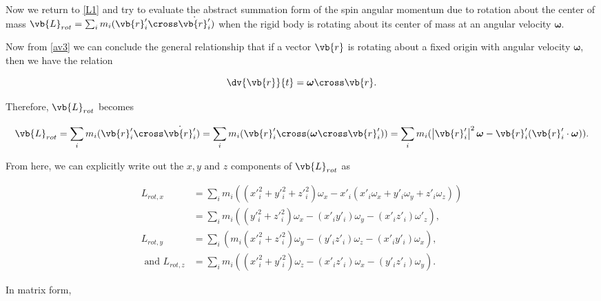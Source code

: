 \documentclass[a4paper,12pt]{report}
\begin{document}
Now we return to \cref{L1} and try to evaluate the abstract summation form of the spin angular momentum due to rotation about the center of mass \(\vb{L} _{rot} = \sum_{i}^{} m_{i} (\vb{r} '_{i} \cross \dot{\vb{r} '_{i} } )  \) when the rigid body is rotating about its center of mass at an angular velocity \(\boldsymbol{\omega } \).

Now from \cref{av3} we can conclude the general relationship that if a vector \(\vb{r} \)  is rotating about a fixed origin with angular velocity \(\boldsymbol{\omega } \), then we have the relation 

\begin{equation}
	\dv{\vb{r} }{t} =  \boldsymbol{\omega } \cross \vb{r} . \label{rotchange}  
\end{equation}

Therefore, \(\vb{L} _{rot} \)  becomes

\begin{equation}
	\vb{L} _{rot} = \sum_{i}^{} m_{i} (\vb{r} '_{i} \cross \dot{\vb{r} '_{i} } ) = \sum_{i}^{} m_{i} (\vb{r} '_{i} \cross (\boldsymbol{\omega } \cross \vb{r} '_{i}) ) = \sum_{i}^{} m_{i} (\left| \vb{r} '_{i}  \right| ^2 \boldsymbol{\omega } - \vb{r} '_{i} (\vb{r} '_{i} \cdot \boldsymbol{\omega } )). 
\end{equation}

From here, we can explicitly write out the \(x,y \text{ and } z\) components of \(\vb{L} _{rot} \) as

\begin{equation}
	\begin{aligned}
		L_{rot,x} &= \sum_{i}^{} m_{i} ((x'_{i} ^2 + y'_{i} ^2 + z'_{i} ^2)\omega  _{x} - x'_{i} (x'_{i} \omega _{x} + y'_{i} \omega _{y} + z'_{i} \omega _{z} )) \\ 
		      &= \sum_{i}^{} m_{i} ((y'_{i} ^2 + z'_{i} ^2)\omega _{x} - (x'_{i} y'_{i} )\omega _{y} - (x'_{i} z'_{i}) \omega '_{z}) , \\ 
		L_{rot,y} &= \sum_{i}^{} (m_{i} (x'_{i} ^2 + z'_{i} ^2)\omega _{y} - (y'_{i} z'_{i} )\omega _{z} - (x'_{i} y'_{i} )\omega _{x}), \\ 
		\text{ and }  L_{rot,z} &= \sum_{i}^{} m_{i} ((x'_{i} ^2 + y'_{i} ^2) \omega _{z} - (x'_{i} z'_{i} )\omega _{x} - (y'_{i} z'_{i} )\omega _{y}) . 
	\end{aligned}
\end{equation}

In matrix form, 
\end{document}

